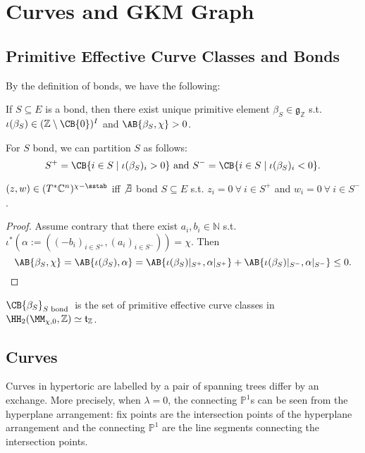 \section{Curves and GKM Graph}

\subsection{Primitive Effective Curve Classes and Bonds}

By the definition of bonds, we have the following:
\begin{proposition}[pps:]{}
    If $S\subseteq E$ is a bond, then there exist unique primitive element $\beta_S\in \mathfrak{g}_\mathbb{Z}$ s.t. $\iota(\beta_S)\in (\mathbb{Z}\setminus \CB{0})^I$ and $\AB{\beta_S,\chi}>0$.
\end{proposition}

For $S$ bond, we can partition $S$ as follows:
\[
    S^+=\CB{i\in S\mid \iota(\beta_S)_i>0}\textnormal{ and }S^-=\CB{i\in S\mid \iota(\beta_S)_i<0}.
\]


\begin{corollary}[crl:]{}
    $(z,w)\in (T^*\mathbb{C}^n)^{\chi-\sstab}$ iff $\not\exists$ bond $S\subseteq E$ s.t. $z_i=0\ \forall\ i\in S^+$ and $w_i=0\ \forall\ i\in S^-$.
    \begin{proof}
        Assume contrary that there exist $a_i,b_i\in \mathbb{N}$ s.t. $\iota^*(\alpha:=((-b_i)_{i\in S^+},(a_i)_{i\in S^-}))=\chi$. Then
        \[
            \AB{\beta_S,\chi}=\AB{\iota(\beta_S),\alpha}=\AB{\iota(\beta_S)|_{S^+},\alpha|_{S^+}}+\AB{\iota(\beta_S)|_{S^-},\alpha|_{S^-}}\leq 0.
        \]
    \end{proof}
\end{corollary}

\begin{theorem}[thm:]{\cite{mcbreen2012quantum}}
    $\CB{\beta_S}_{S\textnormal{ bond }}$ is the set of primitive effective curve classes in $\HH_2(\MM_{\chi,0},\mathbb{Z})\simeq \mathfrak{t}_{\mathbb{Z}}$.
\end{theorem}

\subsection{Curves }

Curves in hypertoric are labelled by a pair of spanning trees differ by an exchange.
More precisely, when $\lambda=0$, the connecting $\mathbb{P}^1$s can be seen from the hyperplane arrangement: fix points are the intersection points of the hyperplane arrangement and the connecting $\mathbb{P}^1$ are the line segments connecting the intersection points.

